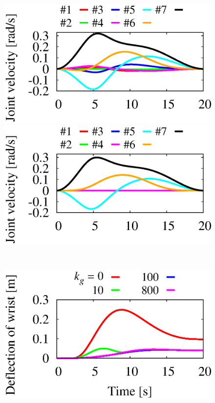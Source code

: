 %
\begin{figure}[t]
  \centering
  \begin{minipage}[h]{0.40\linewidth}
    \includegraphics[width=1.0\linewidth]{fig/chapter4/inspection/case2/RL-M/U01_joint_velo.eps}
  \end{minipage}
  \begin{minipage}[h]{0.40\linewidth}
    \includegraphics[width=1.0\linewidth]{fig/chapter4/inspection/case2/CONV/U01_joint_velo.eps}
  \end{minipage}\\
  \vspace{-5mm}
  \begin{minipage}[h]{0.40\linewidth}
    \centering
    \includegraphics[width=1.0\linewidth]{fig/chapter4/inspection/case2/RL-M/U13_wrist_deflection.eps}

\end{minipage}
\end{figure}
